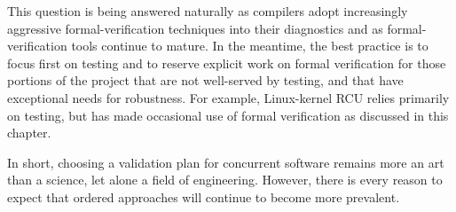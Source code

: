 This question is being answered naturally as compilers adopt increasingly
aggressive formal-verification techniques into their diagnostics and
as formal-verification tools continue to mature.
In the meantime, the best practice is to focus first on testing and to
reserve explicit work on formal verification for those portions of the
project that are not well-served by testing, and that have exceptional
needs for robustness.
For example, Linux-kernel RCU relies primarily on testing, but has
made occasional use of formal verification as discussed in this chapter.

In short, choosing a validation plan for concurrent software remains
more an art than a science, let alone a field of engineering.
However, there is every reason to expect that ordered approaches
will continue to become more prevalent.
